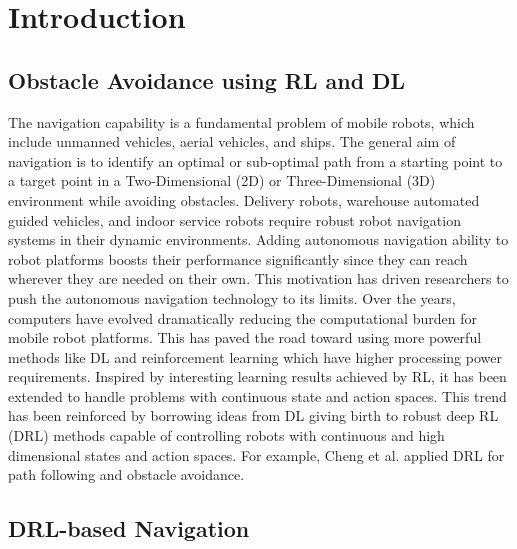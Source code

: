 


\newpage
\section{Introduction}

\subsection{Obstacle Avoidance using RL and DL}
The navigation capability is a fundamental problem of mobile robots, which include unmanned vehicles, aerial vehicles, and ships. The general aim of navigation is to identify an optimal or sub-optimal path from a starting point to a target point in a Two-Dimensional (2D) or Three-Dimensional (3D) environment while avoiding obstacles. Delivery robots, warehouse automated guided vehicles, and indoor service robots require robust robot navigation systems in their dynamic environments. 
Adding autonomous navigation ability to robot platforms boosts their performance signiﬁcantly since they can reach wherever they are needed on their own. This motivation has driven researchers to push the autonomous navigation technology to its limits.
Over the years, computers have evolved dramatically reducing the computational burden for mobile robot platforms. This has paved the road toward using more powerful methods like DL and reinforcement learning which have higher processing power requirements.
Inspired by interesting learning results achieved by RL, it has been extended to handle problems with continuous state and action spaces. This trend has been reinforced by borrowing ideas from DL giving birth to robust deep RL (DRL) methods capable of controlling robots with continuous and high dimensional states and action spaces. For example, Cheng et al.\cite{Cheng2022} applied DRL for path following and obstacle avoidance.



\subsection{DRL-based Navigation}

